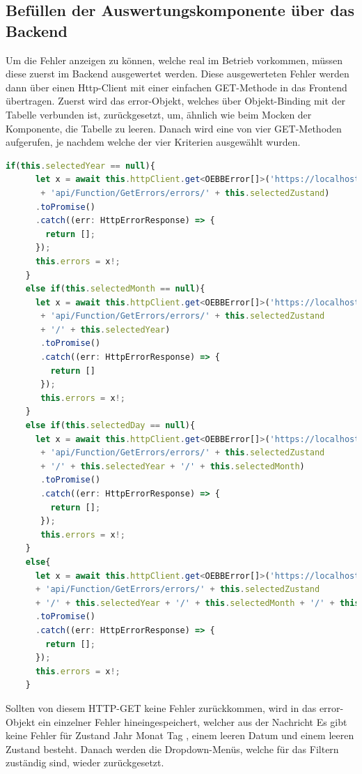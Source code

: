\subsection{Befüllen der Auswertungskomponente über das Backend}
Um die Fehler anzeigen zu können, welche real im Betrieb vorkommen, müssen diese zuerst im Backend ausgewertet werden. Diese 
ausgewerteten Fehler werden dann über einen Http-Client mit einer einfachen GET-Methode in das Frontend übertragen.
Zuerst wird das error-Objekt, welches über Objekt-Binding mit der Tabelle verbunden ist, zurückgesetzt, um, ähnlich wie beim
Mocken der Komponente, die Tabelle zu leeren. Danach wird eine von vier GET-Methoden aufgerufen, je nachdem welche der vier
Kriterien ausgewählt wurden.

\begin{lstlisting}[language=Typescript, caption={GET-Methoden zum Zugriff auf das Backend}]
    if(this.selectedYear == null){
      let x = await this.httpClient.get<OEBBError[]>('https://localhost:5001/'
       + 'api/Function/GetErrors/errors/' + this.selectedZustand)
      .toPromise()
      .catch((err: HttpErrorResponse) => {
        return [];
      });
      this.errors = x!;
    }
    else if(this.selectedMonth == null){
      let x = await this.httpClient.get<OEBBError[]>('https://localhost:5001/'
       + 'api/Function/GetErrors/errors/' + this.selectedZustand
       + '/' + this.selectedYear)
       .toPromise()
       .catch((err: HttpErrorResponse) => {
         return []
       });
       this.errors = x!;
    }
    else if(this.selectedDay == null){
      let x = await this.httpClient.get<OEBBError[]>('https://localhost:5001/'
       + 'api/Function/GetErrors/errors/' + this.selectedZustand
       + '/' + this.selectedYear + '/' + this.selectedMonth)
       .toPromise()
       .catch((err: HttpErrorResponse) => {
         return [];
       });
       this.errors = x!;
    }
    else{
      let x = await this.httpClient.get<OEBBError[]>('https://localhost:5001/'
      + 'api/Function/GetErrors/errors/' + this.selectedZustand
      + '/' + this.selectedYear + '/' + this.selectedMonth + '/' + this.selectedDay)
      .toPromise()
      .catch((err: HttpErrorResponse) => {
        return [];
      });
      this.errors = x!;
    }
\end{lstlisting}


Sollten von diesem HTTP-GET keine Fehler zurückkommen, wird in das error-Objekt ein einzelner Fehler hineingespeichert, welcher aus
der Nachricht \dq Es gibt keine Fehler für {Zustand} {Jahr} {Monat} {Tag} \dq, einem leeren Datum und einem leeren Zustand besteht.
Danach werden die Dropdown-Menüs, welche für das Filtern zuständig sind, wieder zurückgesetzt.

